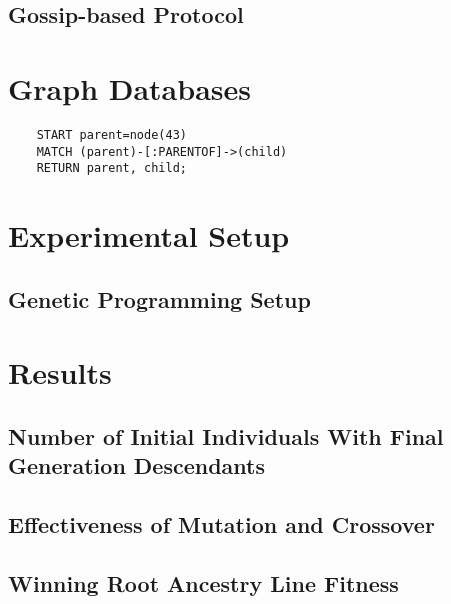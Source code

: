 \documentclass{sig-alternate}
\begin{document}
\subsection{Gossip-based Protocol}
\label{sec:GBP}



\section{Graph Databases}
\label{sec:Graph Databases}



\begin{verbatim}
    START parent=node(43)
    MATCH (parent)-[:PARENTOF]->(child)
    RETURN parent, child;
\end{verbatim}


\section{Experimental Setup} 
\label{sec:experiments}


\subsection{Genetic Programming Setup}
\label{sec:GPSetup}


\section{Results} \label{sec:results}



\subsection{Number of Initial Individuals With Final Generation Descendants}
\label{sec:numberInitialIndividualsWithDescendants}



\subsection{Effectiveness of Mutation and Crossover}
\label{sec:effectivenessMutationCrossover}



\subsection{Winning Root Ancestry Line Fitness}
\label{sec:WinningRootLineFitness}
\end{document}
